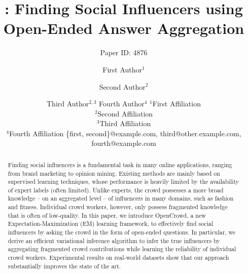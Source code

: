 \documentclass{article}
\title{\sys: Finding Social Influencers using Open-Ended Answer Aggregation}
\author{
Paper ID: 4876
}
\author{
First Author$^1$
\and
Second Author$^2$\and
Third Author$^{2,3}$\And
Fourth Author$^4$
\affiliations
$^1$First Affiliation\\
$^2$Second Affiliation\\
$^3$Third Affiliation\\
$^4$Fourth Affiliation
\emails
\{first, second\}@example.com,
third@other.example.com,
fourth@example.com
}
\newcommand{\sys}{OpenCrowd\xspace}
\begin{document}
\maketitle

\begin{abstract}
Finding social influencers is a fundamental task in many online applications, ranging from brand marketing to opinion mining. Existing methods are mainly based on supervised learning techniques, whose performance is heavily limited by the availability of expert labels (often limited). Unlike experts, the crowd possesses a more broad knowledge -- on an aggregated level -- of influencers in many domains, such as fashion and fitness. Individual crowd workers, however, only possess fragmented knowledge that is often of low-quality. In this paper, we introduce \sys, a new Expectation-Maximization (EM) learning framework, to effectively find social influencers by asking the crowd in the form of open-ended questions. In particular, we derive an efficient variational inference algorithm to infer the true influencers by aggregating fragmented crowd contributions while learning the reliability of individual crowd workers. Experimental results on real-world datasets show that our approach substantially improves the state of the art.
\end{abstract}





\label{sec:intro}


\label{sec:problem}


\label{sec:method}


\label{sec:result}


\label{sec:related}


\label{sec:conclusion}









\end{document}

